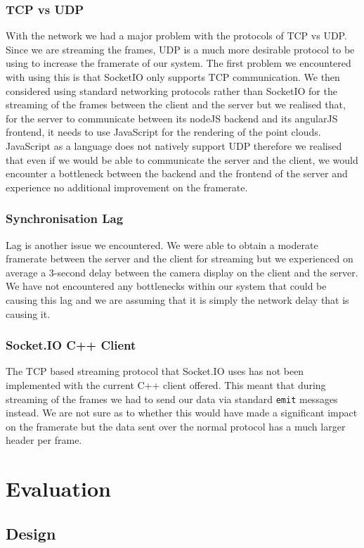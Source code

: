 \documentclass{article}
\begin{document}
\subsubsection{TCP vs UDP}
With the network we had a major problem with the protocols of TCP vs UDP. Since we are streaming the frames, UDP is a much more desirable protocol to be using to increase the framerate of our system. The first problem we encountered with using this is that SocketIO only supports TCP communication. We then considered using standard networking protocols rather than SocketIO for the streaming of the frames between the client and the server but we realised that, for the server to communicate between its nodeJS backend and its angularJS frontend, it needs to use JavaScript for the rendering of the point clouds. JavaScript as a language does not natively support UDP therefore we realised that even if we would be able to communicate the server and the client, we would encounter a bottleneck between the backend and the frontend of the server and experience no additional improvement on the framerate.
\subsubsection{Synchronisation Lag}
Lag is another issue we encountered. We were able to obtain a moderate framerate between the server and the client for streaming but we experienced on average a 3-second delay between the camera display on the client and the server. We have not encountered any bottlenecks within our system that could be causing this lag and we are assuming that it is simply the network delay that is causing it.
\subsubsection{Socket.IO C++ Client}
The TCP based streaming protocol that Socket.IO uses has not been implemented with the current C++ client offered.
This meant that during streaming of the frames we had to send our data via standard \texttt{emit} messages instead. We are not sure as to whether this would have made a significant impact on the framerate but the data sent over the normal protocol has a much larger header per frame.

\newpage
\section{Evaluation}
\subsection{Design}
\end{document}
